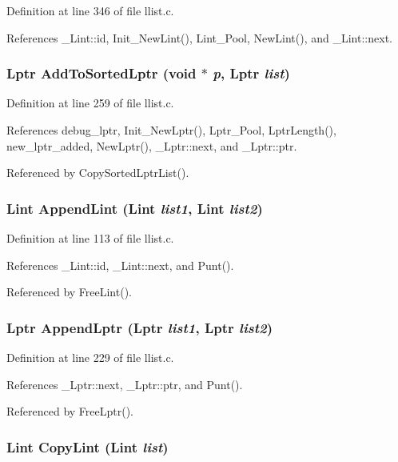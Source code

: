 Definition at line 346 of file llist.c.

References \_\-Lint::id, Init\_\-New\-Lint(), Lint\_\-Pool, New\-Lint(), and \_\-Lint::next.
\subsubsection{\setlength{\rightskip}{0pt plus 5cm}\bf{Lptr} Add\-To\-Sorted\-Lptr (void $\ast$ {\em p}, \bf{Lptr} {\em list})}\label{llist_8h_1f0ae7d6ec6c11395d4b9fe0b07dc2ce}




Definition at line 259 of file llist.c.

References debug\_\-lptr, Init\_\-New\-Lptr(), Lptr\_\-Pool, Lptr\-Length(), new\_\-lptr\_\-added, New\-Lptr(), \_\-Lptr::next, and \_\-Lptr::ptr.

Referenced by Copy\-Sorted\-Lptr\-List().
\subsubsection{\setlength{\rightskip}{0pt plus 5cm}\bf{Lint} Append\-Lint (\bf{Lint} {\em list1}, \bf{Lint} {\em list2})}\label{llist_8h_2179fc2f36a0d9e8b7d5f2516a41d05c}




Definition at line 113 of file llist.c.

References \_\-Lint::id, \_\-Lint::next, and Punt().

Referenced by Free\-Lint().
\subsubsection{\setlength{\rightskip}{0pt plus 5cm}\bf{Lptr} Append\-Lptr (\bf{Lptr} {\em list1}, \bf{Lptr} {\em list2})}\label{llist_8h_3ecac7cf653c91736f83237f705a8be2}




Definition at line 229 of file llist.c.

References \_\-Lptr::next, \_\-Lptr::ptr, and Punt().

Referenced by Free\-Lptr().
\subsubsection{\setlength{\rightskip}{0pt plus 5cm}\bf{Lint} Copy\-Lint (\bf{Lint} {\em list})}\label{llist_8h_726bca829c3a58be74ad11ac03b13900}




